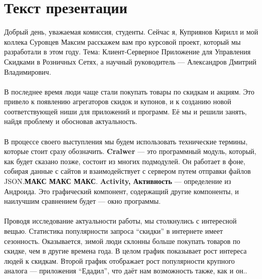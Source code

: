 \documentclass[12pt]{article}
\begin{document}
\section*{Текст презентации}

Добрый день, уважаемая комиссия, студенты. Сейчас я, Куприянов Кирилл и мой
коллека Суровцев Максим расскажем вам про курсовой проект, который мы
разработали в этом году. Тема: Клиент-Серверное Приложение для Управления
Скидками в Розничных Сетях, а научный руководитель --- Александров Дмитрий
Владимирович.\\\\
В последнее время люди чаще стали покупать товары по скидкам и акциям. Это
привело к появлению агрегаторов скидок и купонов, и к созданию новой
соответствующей ниши для приложений и программ. Её мы и решили занять, найдя
проблему и обосновав актуальность.\\\\
В процессе своего выступления мы будем использовать технические термины,
которые стоит сразу обозначить. \textbf{Cralwer} --- это программный модуль,
который, как будет сказано позже, состоит из многих подмодулей. Он работает в
фоне, собирая данные с сайтов и взаимодействует с сервером путем отправки
файлов JSON.\@ \textbf{МАКС МАКС МАКС}. \textbf{Activity, Активность} ---
определение из Андроида. Это графический компонент, содержащий другие компоненты, и наилучшим сравнением будет --- окно программы.\\\\
Проводя исследование актуальности работы, мы столкнулись с интересной вещью.
Статистика популярности запроса ``скидки'' в интернете имеет сезонность.
Оказывается, зимой люди склонны больше покупать товаров по скидке, чем в другие
времена года. В целом график показывает рост интереса людей к скидкам. Второй
график отображает рост популярности крупного аналога --- приложения ``Едадил'',
что даёт нам возможность также, как и он..


\end{document}
